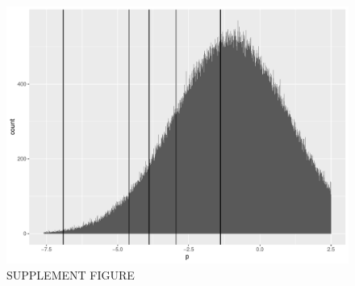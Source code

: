\documentclass{article}
\begin{document}
\begin{figure}[h!]
\includegraphics[width=\textwidth]{../visualisations/figures/pint_prior.pdf}
\caption{SUPPLEMENT FIGURE}
\label{fig:p_int_prior}
\end{figure}
\end{document}
